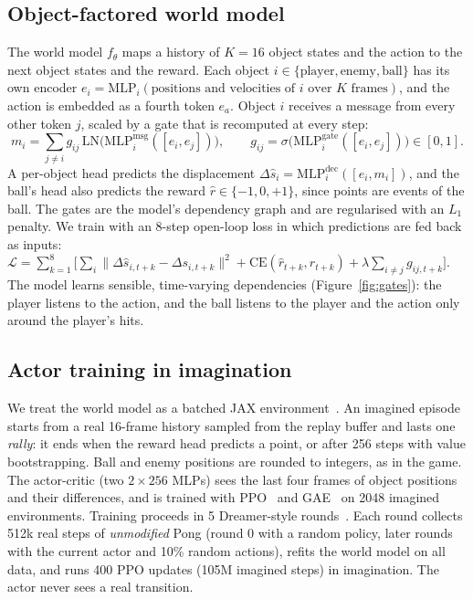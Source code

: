 \documentclass{article}
\begin{document}
\subsection{Object-factored world model}
\label{sec:wm}

The world model $f_\theta$ maps a history of $K=16$ object states and the action to the next object
states and the reward. Each object $i\in\{\text{player},\text{enemy},\text{ball}\}$ has its own
encoder $e_i = \mathrm{MLP}_i(\text{positions and velocities of } i \text{ over } K \text{ frames})$,
and the action is embedded as a fourth token $e_a$. Object $i$ receives a message from every other
token $j$, scaled by a gate that is recomputed at every step:
\begin{equation}
  m_i = \sum_{j\neq i} g_{ij}\,\mathrm{LN}\big(\mathrm{MLP}^{\text{msg}}_i([e_i, e_j])\big),\qquad
  g_{ij} = \sigma\big(\mathrm{MLP}^{\text{gate}}_i([e_i,e_j])\big)\in[0,1].
  \label{eq:gates}
\end{equation}
A per-object head predicts the displacement $\Delta\hat s_i = \mathrm{MLP}^{\text{dec}}_i([e_i, m_i])$,
and the ball's head also predicts the reward $\hat r\in\{-1,0,+1\}$, since points are events of the
ball. The gates are the model's dependency graph and are regularised with an $L_1$ penalty. We train
with an 8-step open-loop loss in which predictions are fed back as inputs:
$\mathcal{L}=\sum_{k=1}^{8}\big[\sum_i\|\Delta\hat s_{i,t+k}-\Delta s_{i,t+k}\|^2 + \mathrm{CE}(\hat r_{t+k}, r_{t+k}) + \lambda \sum_{i\neq j} g_{ij,t+k}\big]$.
The model learns sensible, time-varying dependencies (Figure~\ref{fig:gates}): the player listens
to the action, and the ball listens to the player and the action only around the player's hits.

\subsection{Actor training in imagination}
\label{sec:ppo}

We treat the world model as a batched JAX environment~\cite{jaxatari}. An imagined episode starts
from a real 16-frame history sampled from the replay buffer and lasts one \emph{rally}: it ends when
the reward head predicts a point, or after 256 steps with value bootstrapping. Ball and enemy
positions are rounded to integers, as in the game. The actor-critic (two $2{\times}256$ MLPs) sees the
last four frames of object positions and their differences, and is trained with PPO~\cite{schulman2017ppo}
and GAE~\cite{schulman2016gae} on 2048 imagined environments. Training proceeds in 5 Dreamer-style
rounds~\cite{hafner2020dreamer}. Each round collects 512k real steps of \emph{unmodified} Pong (round 0
with a random policy, later rounds with the current actor and 10\% random actions), refits the world
model on all data, and runs 400 PPO updates (105M imagined steps) in imagination. The actor never
sees a real transition.
\end{document}
